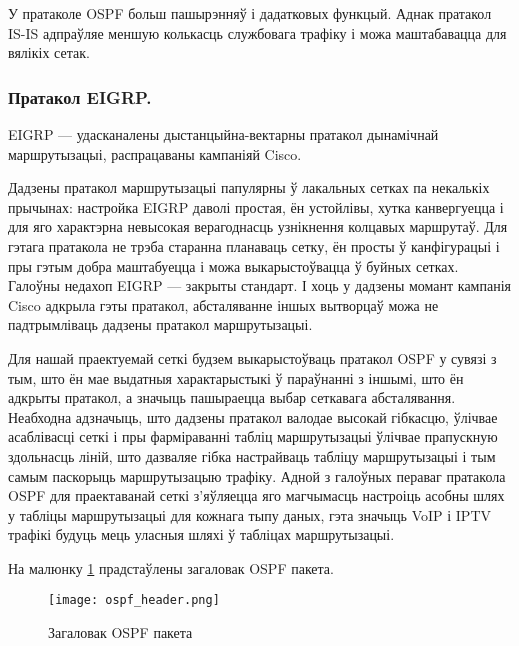 У пратаколе OSPF больш пашырэнняў і дадатковых функцый. Аднак пратакол IS-IS адпраўляе меншую колькасць службовага трафіку і можа маштабавацца для вялікіх сетак.

\subsubsection{Пратакол EIGRP.}
EIGRP --- удасканалены дыстанцыйна-вектарны пратакол дынамічнай маршрутызацыі, распрацаваны кампаніяй Cisco.

Дадзены пратакол маршрутызацыі папулярны ў лакальных сетках па некалькіх прычынах: настройка EIGRP даволі простая, ён устойлівы, хутка канвергуецца і для яго характэрна невысокая верагоднасць узнікнення колцавых маршрутаў. Для гэтага пратакола не трэба старанна планаваць сетку, ён просты ў канфігурацыі і пры гэтым добра маштабуецца і можа выкарыстоўвацца ў буйных сетках. Галоўны недахоп EIGRP --- закрыты стандарт. І хоць у дадзены момант кампанія Cisco адкрыла гэты пратакол, абсталяванне іншых вытворцаў можа не падтрымліваць дадзены пратакол маршрутызацыі.

Для нашай праектуемай сеткі будзем выкарыстоўваць пратакол OSPF у сувязі
з тым, што ён мае выдатныя характарыстыкі ў параўнанні з іншымі, што ён
адкрыты пратакол, а значыць пашыраецца выбар сеткавага абсталявання.
Неабходна адзначыць, што дадзены пратакол валодае высокай гібкасцю, ўлічвае асаблівасці сеткі і пры фарміраванні табліц маршрутызацыі ўлічвае прапускную здольнасць ліній, што дазваляе гібка настрайваць табліцу маршрутызацыі і тым самым паскорыць маршрутызацыю трафіку.
Адной з галоўных пераваг пратакола OSPF для праектаванай сеткі
з'яўляецца яго магчымасць настроіць асобны шлях у табліцы
маршрутызацыі для кожнага тыпу даных, гэта значыць VoIP і IPTV
трафікі будуць мець уласныя шляхі ў табліцах маршрутызацыі.

На малюнку \ref{figure: OSPF Header} прадстаўлены загаловак OSPF пакета.

\begin{figure}[h!]
    \centering
    \texttt{[image: ospf\_header.png]}
    \vspace{-0.7\baselineskip}
    \caption{Загаловак OSPF пакета}
    \label{figure: OSPF Header}
\end{figure}

